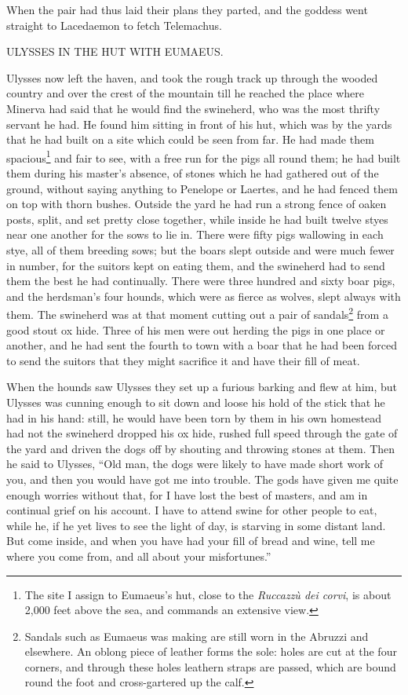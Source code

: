 When the pair had thus laid their plans they parted, and the goddess went
straight to Lacedaemon to fetch Telemachus.


ULYSSES IN THE HUT WITH EUMAEUS.

Ulysses now left the haven, and took the rough track up through the wooded
country and over the crest of the mountain till he reached the place where
Minerva had said that he would find the swineherd, who was the most thrifty
servant he had. He found him sitting in front of his hut, which was by the
yards that he had built on a site which could be seen from far. He had made
them spacious\footnote{The site I assign to Eumaeus’s hut, close to the \emph{Ruccazzù dei corvi},
is about 2,000 feet above the sea, and commands an extensive view.} and fair to see, with a free run
for the pigs all round them; he had built them during his master’s absence, of
stones which he had gathered out of the ground, without saying anything to
Penelope or Laertes, and he had fenced them on top with thorn bushes. Outside
the yard he had run a strong fence of oaken posts, split, and set pretty close
together, while inside he had built twelve styes near one another for the sows
to lie in. There were fifty pigs wallowing in each stye, all of them breeding
sows; but the boars slept outside and were much fewer in number, for the
suitors kept on eating them, and the swineherd had to send them the best he had
continually. There were three hundred and sixty boar pigs, and the herdsman’s
four hounds, which were as fierce as wolves, slept always with them. The
swineherd was at that moment cutting out a pair of sandals\footnote{Sandals such as Eumaeus was making are still worn in the Abruzzi and
elsewhere. An oblong piece of leather forms the sole: holes are cut at the
four corners, and through these holes leathern straps are passed, which are
bound round the foot and cross-gartered up the calf.} from a good
stout ox hide. Three of his men were out herding the pigs in one place or
another, and he had sent the fourth to town with a boar that he had been forced
to send the suitors that they might sacrifice it and have their fill of meat.

When the hounds saw Ulysses they set up a furious barking and flew at him, but
Ulysses was cunning enough to sit down and loose his hold of the stick that he
had in his hand: still, he would have been torn by them in his own homestead
had not the swineherd dropped his ox hide, rushed full speed through the gate
of the yard and driven the dogs off by shouting and throwing stones at them.
Then he said to Ulysses, “Old man, the dogs were likely to have made short work
of you, and then you would have got me into trouble. The gods have given me
quite enough worries without that, for I have lost the best of masters, and am
in continual grief on his account. I have to attend swine for other people to
eat, while he, if he yet lives to see the light of day, is starving in some
distant land. But come inside, and when you have had your fill of bread and
wine, tell me where you come from, and all about your misfortunes.”

